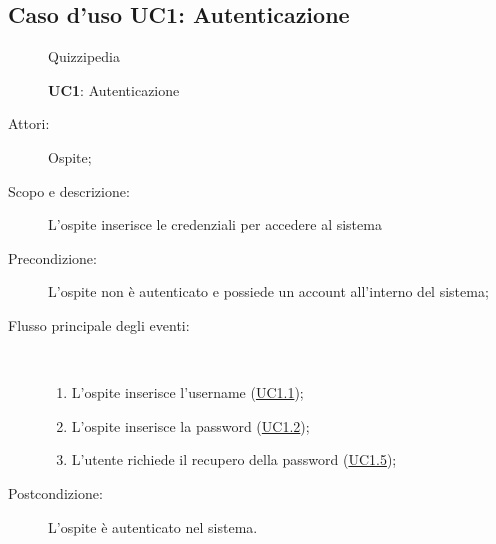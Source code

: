 \hypertarget{UC1}{}
\subsection{Caso d'uso UC1: Autenticazione}
\begin{figure}[H]
	\centering
	\begin{resizedtikzpicture}{\textwidth}
		\begin{umlsystem}[x=0, fill=lightgray!20]{Quizzipedia}
		\end{umlsystem}
	\end{resizedtikzpicture}
	\caption{\textbf{UC1}: Autenticazione}
	\label{UC1}
\end{figure}
\begin{description}
	\item[Attori:] Ospite;
	\item[Scopo e descrizione:] L'ospite inserisce le credenziali per accedere al sistema
	\item[Precondizione:] L'ospite non è autenticato e possiede un account all'interno del sistema;
	
	\item[Flusso principale degli eventi:] \ 
	\begin{enumerate}
		\item L'ospite inserisce l'username (\hyperlink{UC1.1}{UC1.1});
		\item L'ospite inserisce la password (\hyperlink{UC1.2}{UC1.2});
		\item L'utente richiede il recupero della password (\hyperlink{UC1.5}{UC1.5});
		
	\end{enumerate}
	\item[Postcondizione:] L’ospite è autenticato nel sistema.
\end{description}
\hypertarget{UC1.1}{}
